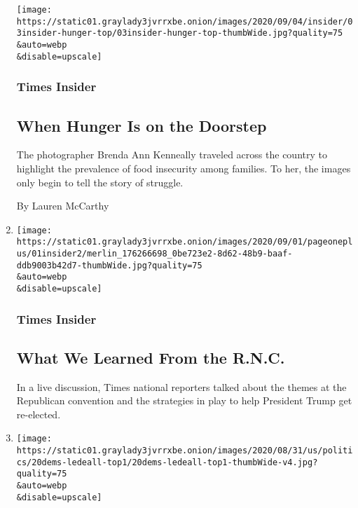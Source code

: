 \begin{enumerate}
  \texttt{[image: https://static01.graylady3jvrrxbe.onion/images/2020/09/04/insider/03insider-hunger-top/03insider-hunger-top-thumbWide.jpg?quality=75\\\&auto=webp\\\&disable=upscale]}

  \hypertarget{times-insider-8}{%
  \subsubsection{Times Insider}\label{times-insider-8}}

  \hypertarget{when-hunger-is-on-the-doorstep}{%
  \subsection{When Hunger Is on the
  Doorstep}\label{when-hunger-is-on-the-doorstep}}

  The photographer Brenda Ann Kenneally traveled across the country to
  highlight the prevalence of food insecurity among families. To her,
  the images only begin to tell the story of struggle.

  By Lauren McCarthy
\item
  \href{/2020/09/01/insider/rnc-recap.html}{}

  \texttt{[image: https://static01.graylady3jvrrxbe.onion/images/2020/09/01/pageoneplus/01insider2/merlin\_176266698\_0be723e2-8d62-48b9-baaf-ddb9003b42d7-thumbWide.jpg?quality=75\\\&auto=webp\\\&disable=upscale]}

  \hypertarget{times-insider-9}{%
  \subsubsection{Times Insider}\label{times-insider-9}}

  \hypertarget{what-we-learned-from-the-rnc}{%
  \subsection{What We Learned From the
  R.N.C.}\label{what-we-learned-from-the-rnc}}

  In a live discussion, Times national reporters talked about the themes
  at the Republican convention and the strategies in play to help
  President Trump get re-elected.
\item
  \href{/2020/08/31/insider/democratic-convention-talk.html}{}

  \texttt{[image: https://static01.graylady3jvrrxbe.onion/images/2020/08/31/us/politics/20dems-ledeall-top1/20dems-ledeall-top1-thumbWide-v4.jpg?quality=75\\\&auto=webp\\\&disable=upscale]}


\end{enumerate}
